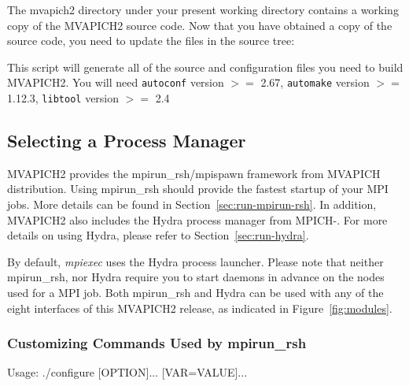 The mvapich2 directory under your present working directory contains a working copy of the \mbox{MVAPICH2} source code.
Now that you have obtained a copy of the source code, you need to update the files in the source tree:


This script will generate all of the source and configuration files you
need to build MVAPICH2. You will need \texttt{autoconf} version $>=$ 2.67,
\texttt{automake} version $>=$ 1.12.3, \texttt{libtool} version $>=$ 2.4



\subsection{Selecting a Process Manager}

MVAPICH2 provides the mpirun\_rsh/mpispawn framework from MVAPICH
distribution. Using mpirun\_rsh should provide the fastest startup of
your MPI jobs. More details can be found in
Section~\ref{sec:run-mpirun-rsh}. In addition, MVAPICH2 also includes
the Hydra process manager from MPICH-\mpichversion. For more details on using
Hydra, please refer to Section~\ref{sec:run-hydra}.

By default, \emph{mpiexec} uses the Hydra process launcher. Please note
that neither mpirun\_rsh, nor Hydra require you to start daemons in
advance on the nodes used for a MPI job.
Both mpirun\_rsh and Hydra can be used with any of the eight 
interfaces of this MVAPICH2 release, as indicated in 
Figure~\ref{fig:modules}.

\newpage
\subsubsection{Customizing Commands Used by mpirun\_rsh}
Usage: ./configure [OPTION]... [VAR=VALUE]...

